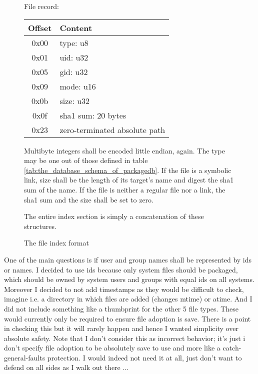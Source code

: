 \documentclass[a4paper]{scrartcl}
\begin{document}
	\begin{figure}[ht]
		
		\begin{center}
			\begin{minipage}{.6\textwidth}
				File record:
				
				\vspace{0.5eM}
				
				\begin{tabular}{|c|l|}
					\hline
					Offset & Content \\
					\hline
					0x00 & type: u8 \\
					\hline
					0x01 & uid: u32 \\
					\hline
					0x05 & gid: u32 \\
					\hline
					0x09 & mode: u16 \\
					\hline
					0x0b & size: u32 \\
					\hline
					0x0f & sha1 sum: 20 bytes \\
					\hline
					0x23 & zero-terminated absolute path \\
					\hline
				\end{tabular}
			\end{minipage}
		\end{center}
		
		\vspace{1eM}
		
		Multibyte integers shall be encoded little endian, again. The type may be one out of those defined in table \ref{tab:the_database_schema_of_packagedb}. If the file is a symbolic link, size shall be the length of its target's name and digest the sha1 sum of the name. If the file is neither a regular file nor a link, the sha1 sum and the size shall be set to zero.
		
		\vspace{1eM}
		
		The entire index section is simply a concatenation of these structures.
		
		\caption{The file index format}
		\label{fig:the_file_index_format}
	\end{figure}

	One of the main questions is if user and group names shall be represented by ids or names. I decided to use ids because only system files should be packaged, which should be owned by system users and groups with equal ids on all systems. Moreover I decided to not add timestamps as they would be difficult to check, imagine i.e. a directory in which files are added (changes mtime) or atime. And I did not include something like a thumbprint for the other 5 file types. These would currently only be required to ensure file adoption is save. There is a point in checking this but it will rarely happen and hence I wanted simplicity over absolute safety. Note that I don't consider this as incorrect behavior; it's just i don't specify file adoption to be absolutely save to use and more like a catch-general-faults protection. I would indeed not need it at all, just don't want to defend on all sides as I walk out there ...
	
\end{document}
